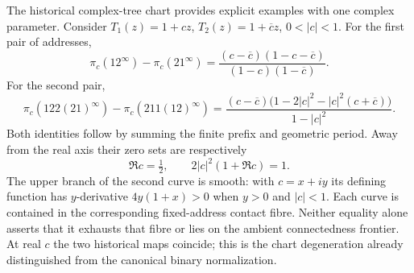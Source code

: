 The historical complex-tree chart provides explicit examples with one
complex parameter. Consider
$T_1(z)=1+cz$, $T_2(z)=1+\overline c z$, $0<|c|<1$.
For the first pair of addresses,
\[
 \pi_c(12^\infty)-\pi_c(21^\infty)
   =\frac{(c-\overline c)(1-c-\overline c)}
          {(1-c)(1-\overline c)}.
\]
For the second pair,
\[
 \pi_c(122(21)^\infty)-\pi_c(211(12)^\infty)
 =\frac{(c-\overline c)
        \bigl(1-2|c|^2-|c|^2(c+\overline c)\bigr)}{1-|c|^2}.
\]
Both identities follow by summing the finite prefix and geometric period.
Away from the real axis their zero sets are respectively
\begin{equation}\label{eq:mirror-two-curves-port}
 \Re c=\tfrac12,\qquad 2|c|^2(1+\Re c)=1.
\end{equation}
The upper branch of the second curve is smooth: with $c=x+iy$ its
defining function has $y$-derivative $4y(1+x)>0$ when $y>0$ and $|c|<1$.
Each curve is contained in the corresponding fixed-address contact fibre.
Neither equality alone asserts that it exhausts that fibre or lies on
the ambient connectedness frontier. At real $c$ the two historical maps
coincide; this is the chart degeneration already distinguished from the
canonical binary normalization.
